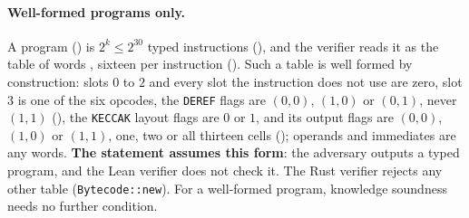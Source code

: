 \documentclass[11pt]{article}
\begin{document}
\paragraph{Well-formed programs only.} A program () is $2^{k} \le 2^{30}$ typed instructions (), and the verifier reads it as the table of words , sixteen per instruction (). Such a table is well formed by construction: slots $0$ to $2$ and every slot the instruction does not use are zero, slot $3$ is one of the six opcodes, the \texttt{DEREF} flags are $(0,0)$, $(1,0)$ or $(0,1)$, never $(1,1)$ (), the \texttt{KECCAK} layout flags are $0$ or $1$, and its output flags are $(0,0)$, $(1,0)$ or $(1,1)$, one, two or all thirteen cells (); operands and immediates are any words. \textbf{The statement assumes this form}: the adversary outputs a typed program, and the Lean verifier does not check it. The Rust verifier rejects any other table (\texttt{Bytecode::new}). For a well-formed program, knowledge soundness needs no further condition.
\end{document}
